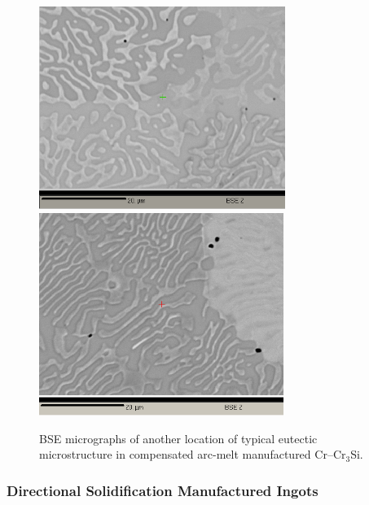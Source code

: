 \vspace*{\fill}
\begin{figure}[H]
\begin{center}
\includegraphics[width=8cm]{_Jun18_sample_1_circle_sideiv_10um_bse_scale}
\includegraphics[width=7.95cm]{_Jun18_sample_1_circle_sidei_20um_scale}
\caption{BSE micrographs of another location of typical eutectic microstructure in compensated arc-melt manufactured Cr--Cr$_3$Si.}
\label{fig:Crarcsample1c}
\end{center}
\end{figure}
%

\subsubsection{Directional Solidification Manufactured Ingots}

